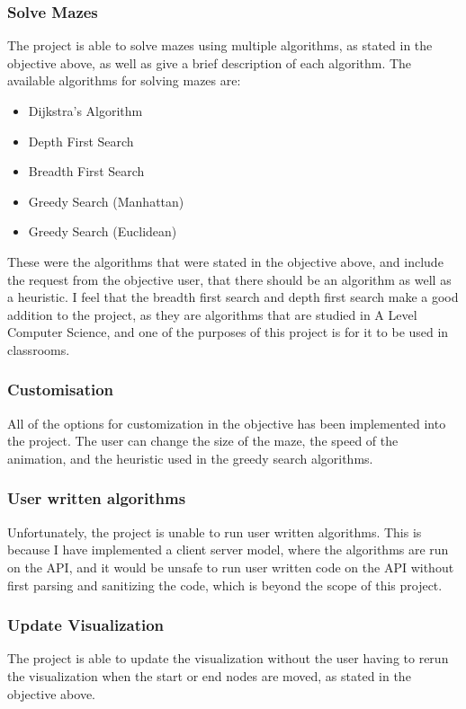 \documentclass[titlepage]{article}
\begin{document}
\subsubsection{Solve Mazes}
The project is able to solve mazes using multiple algorithms, as stated in the objective above, as well as give a brief description of each algorithm. The available algorithms for solving mazes are:
\begin{itemize}
    \item Dijkstra's Algorithm
    \item Depth First Search
    \item Breadth First Search
    \item Greedy Search (Manhattan)
    \item Greedy Search (Euclidean)
\end{itemize}
These were the algorithms that were stated in the objective above, and include the request from the objective user, that there should be an algorithm as well as a heuristic. I feel that the breadth first search and depth first search make a good addition to the project, as they are algorithms that are studied in A Level Computer Science, and one of the purposes of this project is for it to be used in classrooms.

\subsubsection{Customisation}
All of the options for customization in the objective has been implemented into the project. The user can change the size of the maze, the speed of the animation, and the heuristic used in the greedy search algorithms.

\subsubsection{User written algorithms}
Unfortunately, the project is unable to run user written algorithms. This is because I have implemented a client server model, where the algorithms are run on the API, and it would be unsafe to run user written code on the API without first parsing and sanitizing the code, which is beyond the scope of this project.

\subsubsection{Update Visualization}
The project is able to update the visualization without the user having to rerun the visualization when the start or end nodes are moved, as stated in the objective above.
\newpage
\end{document}
